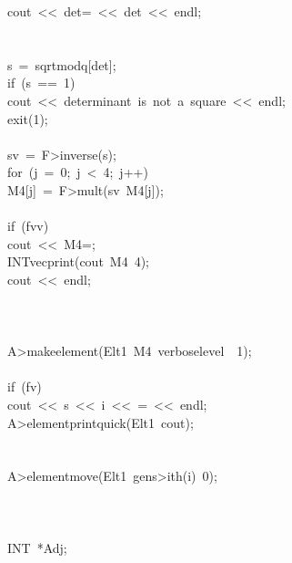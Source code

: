 \begin{tabbing}
\>\>\>\>cout\ <<\ det=\ <<\ det\ <<\ endl;\\[0pt]
\>\>\>\>\\[0pt]
\>\>\\[0pt]
\>\>\>s\ =\ sqrtmodq[det];\\[0pt]
\>\>\>if\ (s\ ==\ 1)\ \\[0pt]
\>\>\>\>cout\ <<\ determinant\ is\ not\ a\ square\ <<\ endl;\\[0pt]
\>\>\>\>exit(1);\\[0pt]
\>\>\>\>\\[0pt]
\>\>\>sv\ =\ F>inverse(s);\\[0pt]
\>\>\>for\ (j\ =\ 0;\ j\ <\ 4;\ j++)\ \\[0pt]
\>\>\>\>M4[j]\ =\ F>mult(sv\ M4[j]);\\[0pt]
\>\>\>\>\\[0pt]
\>\>\>if\ (fvv)\ \\[0pt]
\>\>\>\>cout\ <<\ M4=;\\[0pt]
\>\>\>\>INTvecprint(cout\ M4\ 4);\\[0pt]
\>\>\>\>cout\ <<\ endl;\\[0pt]
\>\>\>\>\\[0pt]
\>\>\>\\[0pt]
\\[0pt]
\>\>A>makeelement(Elt1\ M4\ verboselevel\ \ 1);\\[0pt]
\\[0pt]
\>\>if\ (fv)\ \\[0pt]
\>\>\>cout\ <<\ s\ <<\ i\ <<\ =\ <<\ endl;\\[0pt]
\>\>\>A>elementprintquick(Elt1\ cout);\\[0pt]
\>\>\>\\[0pt]
\>\\[0pt]
\>\>A>elementmove(Elt1\ gens>ith(i)\ 0);\\[0pt]
\>\>\\[0pt]
\>\\[0pt]
\\[0pt]
\>INT\ *Adj;\\[0pt]

\end{tabbing}
